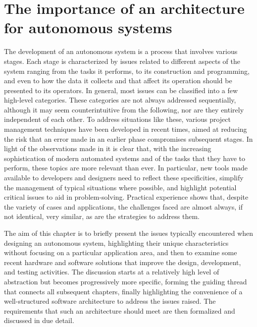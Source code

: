 \chapter{The importance of an architecture for autonomous systems}
\label{ch:prb}
\vspace{-.5cm}

The development of an autonomous system is a process that involves various stages. Each stage is characterized by issues related to different aspects of the system ranging from the tasks it performs, to its construction and programming, and even to how the data it collects and that affect its operation should be presented to its operators. In general, most issues can be classified into a few high-level categories. These categories are not always addressed sequentially, although it may seem counterintuitive from the following, nor are they entirely independent of each other. To address situations like these, various project management techniques have been developed in recent times, aimed at reducing the risk that an error made in an earlier phase compromises subsequent stages. In light of the observations made in  it is clear that, with the increasing sophistication of modern automated systems and of the tasks that they have to perform, these topics are more relevant than ever. In particular, new tools made available to developers and designers need to reflect these specificities, simplify the management of typical situations where possible, and highlight potential critical issues to aid in problem-solving. Practical experience shows that, despite the variety of cases and applications, the challenges faced are almost always, if not identical, very similar, as are the strategies to address them.

The aim of this chapter is to briefly present the issues typically encountered when designing an autonomous system, highlighting their unique characteristics without focusing on a particular application area, and then to examine some recent hardware and software solutions that improve the design, development, and testing activities. The discussion starts at a relatively high level of abstraction but becomes progressively more specific, forming the guiding thread that connects all subsequent chapters, finally highlighting the convenience of a well-structured software architecture to address the issues raised. The requirements that such an architecture should meet are then formalized and discussed in due detail.


